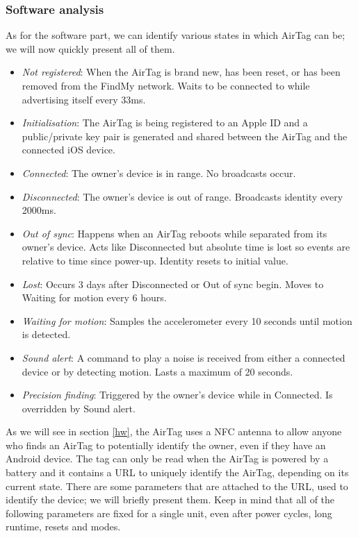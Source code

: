 \documentclass[english]{article}
\begin{document}
\subsubsection{Software analysis}
As for the software part, we can identify various states in which AirTag can be; we will now quickly present all of them.
\begin{itemize}
  \item \textit{Not registered}: When the AirTag is brand new, has been reset, or has been removed from the FindMy network. Waits to be connected to while advertising itself every 33ms.
  \item \textit{Initialisation}: The AirTag is being registered to an Apple ID and a public/private key pair is generated and shared between the AirTag and the connected iOS device.
  \item \textit{Connected}: The owner’s device is in range. No broadcasts occur.
  \item \textit{Disconnected}: The owner’s device is out of range. Broadcasts identity every 2000ms.
  \item \textit{Out of sync}: Happens when an AirTag reboots while separated from its owner’s device. Acts like Disconnected but absolute time is lost so events are relative to time since power-up. Identity resets to initial value.
  \item \textit{Lost}: Occurs 3 days after Disconnected or Out of sync begin. Moves to Waiting for motion every 6 hours.
  \item \textit{Waiting for motion}: Samples the accelerometer every 10 seconds until motion is detected.
  \item \textit{Sound alert}: A command to play a noise is received from either a connected device or by detecting motion. Lasts a maximum of 20 seconds.
  \item \textit{Precision finding}: Triggered by the owner’s device while in Connected. Is overridden by Sound alert.
\end{itemize}
As we will see in section \ref{hw}, the AirTag uses a NFC antenna to allow anyone who finds an AirTag to potentially identify the owner, even if they have an Android device. The tag can only be read when the AirTag is powered by a battery and it contains a URL to uniquely identify the AirTag, depending on its current state. There are some parameters that are attached to the URL, used to identify the device; we will briefly present them. Keep in mind that all of the following parameters are fixed for a single unit, even after power cycles, long runtime, resets and modes.
\end{document}
